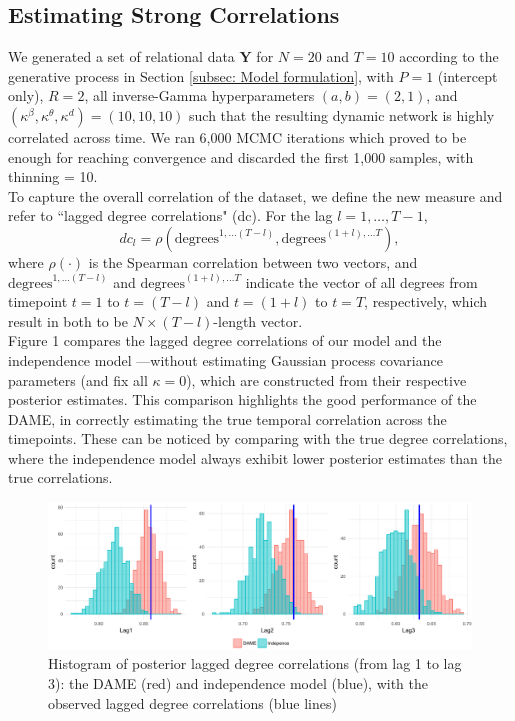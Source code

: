 \documentclass[a4paper]{article}
\begin{document}
\subsection{Estimating Strong Correlations} \label{subsec: correlation}
We generated a set of relational data $\mathbf{Y}$ for $N=20$ and $T=10$ according to the generative process in Section \ref{subsec: Model formulation}, with $P=1$ (intercept only), $R=2$, all inverse-Gamma hyperparameters $(a, b) = (2, 1)$, and $(\kappa^\beta, \kappa^\theta, \kappa^d) = (10, 10, 10)$ such that the resulting dynamic network is highly correlated across time. We ran 6,000 MCMC iterations which proved to be enough for reaching convergence and discarded the first 1,000 samples, with thinning = 10.\\\newline
To capture the overall correlation of the dataset, we define the new measure and refer to ``lagged degree correlations" (dc). For the lag $l=1,\ldots, T-1$,
\begin{equation}
dc_l = \rho(\mbox{degrees}^{1,\ldots (T-l)}, \mbox{degrees}^{(1+l),\ldots T}),
	\end{equation}
where $\rho(\cdot)$ is the Spearman correlation between two vectors, and $\mbox{degrees}^{1,\ldots (T-l)}$ and $\mbox{degrees}^{(1+l),\ldots T}$ indicate the vector of all degrees from timepoint $t=1$ to $t=(T-l)$ and $t=(1+l)$ to $t=T$, respectively, which result in both to be $N \times (T-l)$-length vector. \\ \newline
 Figure 1 compares the lagged degree correlations of our model and the independence model ---without estimating Gaussian process covariance parameters (and fix all $\kappa = 0$), which are constructed from their respective posterior estimates. This comparison highlights the good performance of the DAME, in correctly estimating the true temporal correlation across the timepoints. These can be noticed by comparing with the true degree correlations, where the independence model always exhibit lower posterior estimates than the true correlations.
\begin{figure}[H]
	\centering
		\includegraphics[width=1\textwidth]{plots/correlation_histogram.pdf}	
	\caption {Histogram of posterior lagged degree correlations (from lag 1 to lag 3): the DAME (red) and independence model (blue), with the observed lagged degree correlations (blue lines)}
	\label{figure:correlationstudy}
\end{figure}
\end{document}
